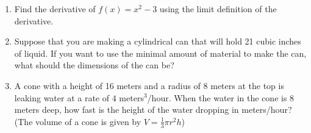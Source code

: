 \documentclass[11pt]{article}
\begin{document}
\begin{enumerate}
  \newpage
  
\item Find the derivative of $f(x)=x^2-3$ using the limit definition
  of the derivative.
  \vfill

\item Suppose that you are making a cylindrical can that will hold 21
  cubic inches of liquid.  If you want to use the minimal amount of
  material to make the can, what should the dimensions of the can be?
  \vfill 
  
  \newpage
  
\item A cone with a height of 16 meters and a radius of 8 meters at
  the top is leaking water at a rate of $4$ meters$^3$/hour.  When
  the water in the cone is 8 meters deep, how fast is the height of
  the water dropping in meters/hour? (The volume of a cone is given by
  $V=\frac{1}{3}\pi r^2 h$)
  
 
\end{enumerate}
\end{document}
